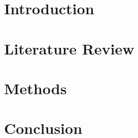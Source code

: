 \documentclass[letterpaper, 12pt, twoside]{article}
\begin{document}


\setcounter{page}{2}





\tableofcontents
\listoftables
\listoffigures




%
%

\part{Introduction}


\part{Literature Review}


\part{Methods}


\part{Conclusion}


\singlespacing

\appendix %








\end{document}
